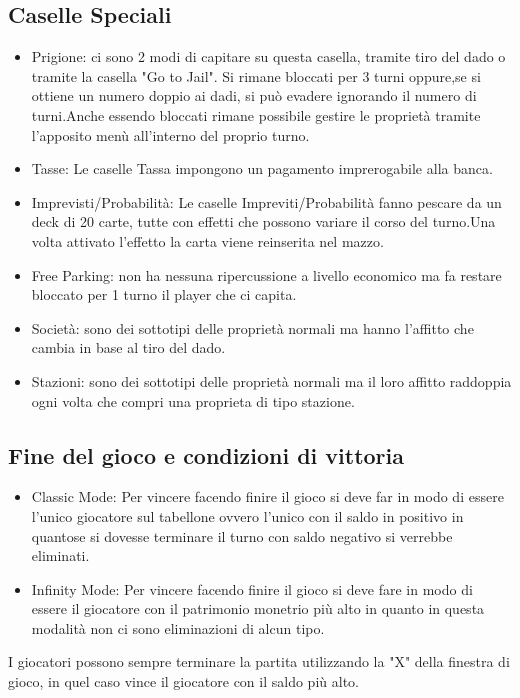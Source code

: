 \subsection{Caselle Speciali}
\begin{itemize}
    \item Prigione: ci sono 2 modi di capitare su questa casella, tramite tiro del dado o tramite la casella "Go to Jail". Si rimane bloccati per 3 turni oppure,\newline se si ottiene un numero doppio ai dadi, si può evadere ignorando il numero di turni.\newline Anche essendo bloccati rimane possibile gestire le proprietà tramite l'apposito menù all'interno del proprio turno.
    \item Tasse: Le caselle Tassa impongono un pagamento imprerogabile alla banca.
    \item Imprevisti/Probabilità: Le caselle Impreviti/Probabilità fanno pescare da un deck di 20 carte, tutte con effetti che possono variare il corso del turno.\newline Una volta attivato l'effetto la carta viene reinserita nel mazzo. 
    \item Free Parking: non ha nessuna ripercussione a livello economico ma fa restare bloccato per 1 turno il player che ci capita.
    \item Società: sono dei sottotipi delle proprietà normali ma hanno l'affitto che cambia in base al tiro del dado.
    \item Stazioni: sono dei sottotipi delle proprietà normali ma il loro affitto raddoppia ogni volta che compri una proprieta di tipo stazione.
\end{itemize}
\subsection{Fine del gioco e condizioni di vittoria}
\begin{itemize}
    \item Classic Mode: Per vincere facendo finire il gioco si deve far in modo di essere l'unico giocatore sul tabellone ovvero l'unico con il saldo in positivo in quanto\newline se si dovesse terminare il turno con saldo negativo si verrebbe eliminati.
    \item Infinity Mode: Per vincere facendo finire il gioco si deve fare in modo di essere il giocatore con il patrimonio monetrio più alto in quanto in questa modalità non ci sono eliminazioni di alcun tipo.
\end{itemize}
I giocatori possono sempre terminare la partita utilizzando la "X" della finestra di gioco, in quel caso vince il giocatore con il saldo più alto.
